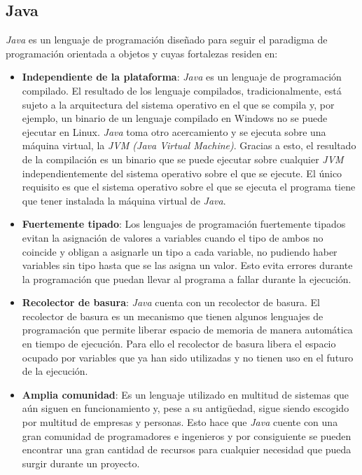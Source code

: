 \subsection{Java}
\textit{Java} \cite{java} es un lenguaje de programación diseñado para seguir el paradigma de programación orientada a objetos y cuyas fortalezas residen en:
\begin{itemize}
	\item \textbf{Independiente de la plataforma}: \textit{Java} es un lenguaje de programación compilado. El resultado de los lenguaje compilados, tradicionalmente, está sujeto a la arquitectura del sistema operativo en el que se compila y, por ejemplo, un binario de un lenguaje compilado en Windows no se puede ejecutar en Linux. \textit{Java} toma otro acercamiento y se ejecuta sobre una máquina virtual, la \textit{JVM (Java Virtual Machine)}. Gracias a esto, el resultado de la compilación es un binario que se puede ejecutar sobre cualquier \textit{JVM} independientemente del sistema operativo sobre el que se ejecute. El único requisito es que el sistema operativo sobre el que se ejecuta el programa tiene que tener instalada la máquina virtual de \textit{Java}.
	\item \textbf{Fuertemente tipado}: Los lenguajes de programación fuertemente tipados evitan la asignación de valores a variables cuando el tipo de ambos no coincide y obligan a asignarle un tipo a cada variable, no pudiendo haber variables sin tipo hasta que se las asigna un valor. Esto evita errores durante la programación que puedan llevar al programa a fallar durante la ejecución.
	\item \textbf{Recolector de basura}: \textit{Java} cuenta con un recolector de basura. El recolector de basura es un mecanismo que tienen algunos lenguajes de programación que permite liberar espacio de memoria de manera automática en tiempo de ejecución. Para ello el recolector de basura libera el espacio ocupado por variables que ya han sido utilizadas y no tienen uso en el futuro de la ejecución.
	\item \textbf{Amplia comunidad}: Es un lenguaje utilizado en multitud de sistemas que aún siguen en funcionamiento y, pese a su antigüedad, sigue siendo escogido por multitud de empresas y personas. Esto hace que \textit{Java} cuente con una gran comunidad de programadores e ingenieros y por consiguiente se pueden encontrar una gran cantidad de recursos para cualquier necesidad que pueda surgir durante un proyecto.
\end{itemize}

